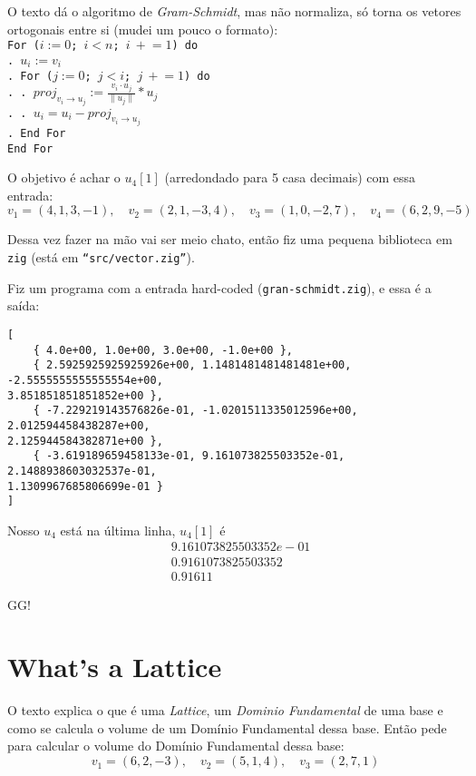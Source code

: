 \documentclass{article}
\begin{document}
O texto dá o algoritmo de \emph{Gram-Schmidt},
mas não normaliza, só torna os vetores ortogonais entre si
(mudei um pouco o formato):
\texttt{ \\
    For (\(i := 0\); \(i < n\); \(i\ +\!\!= 1\)) do \\
    . \(u_i := v_i\) \\
    . For (\(j := 0\); \(j < i\); \(j\ +\!\!= 1\)) do \\
    . . \(proj_{v_i \to u_j} := \frac{ v_i \cdot u_j }{ \|u_j\| } * u_j\) \\
    . . \(u_i = u_i - proj_{v_i \to u_j} \) \\
    . End For \\
    End For 
}

O objetivo é achar o \(u_4[1]\)
(arredondado para 5 casa decimais)
com essa entrada:
\[
    v_1 = (4, 1, 3, -1), \quad
    v_2 = (2, 1, -3, 4), \quad
    v_3 = (1, 0, -2, 7), \quad
    v_4 = (6, 2, 9, -5)
\]

Dessa vez fazer na mão vai ser meio chato,
então fiz uma pequena biblioteca em \texttt{zig}
(está em \texttt{``src/vector.zig''}).

Fiz um programa com a entrada hard-coded
(\texttt{gran-schmidt.zig}),
e essa é a saída:
\begin{verbatim}
[
    { 4.0e+00, 1.0e+00, 3.0e+00, -1.0e+00 },
    { 2.5925925925925926e+00, 1.1481481481481481e+00, -2.5555555555555554e+00,
3.851851851851852e+00 },
    { -7.229219143576826e-01, -1.0201511335012596e+00, 2.012594458438287e+00,
2.125944584382871e+00 },
    { -3.619189659458133e-01, 9.161073825503352e-01, 2.1488938603032537e-01,
1.1309967685806699e-01 }
]
\end{verbatim}

Nosso \(u_4\) está na última linha, \(u_4[1]\) é
\begin{align*}
    & 9.161073825503352e-01 \\
    & 0.9161073825503352 \\
    & 0.91611
\end{align*}

GG!

\section{What's a Lattice}

O texto explica o que é uma \emph{Lattice},
um \emph{Dominio Fundamental} de uma base
e como se calcula o volume de um Domínio Fundamental dessa base.
Então pede para calcular o volume do Domínio Fundamental dessa base:
\[
    v_1 = (6, 2, -3), \quad
    v_2 = (5, 1, 4), \quad
    v_3 = (2, 7, 1)
\]
\end{document}
